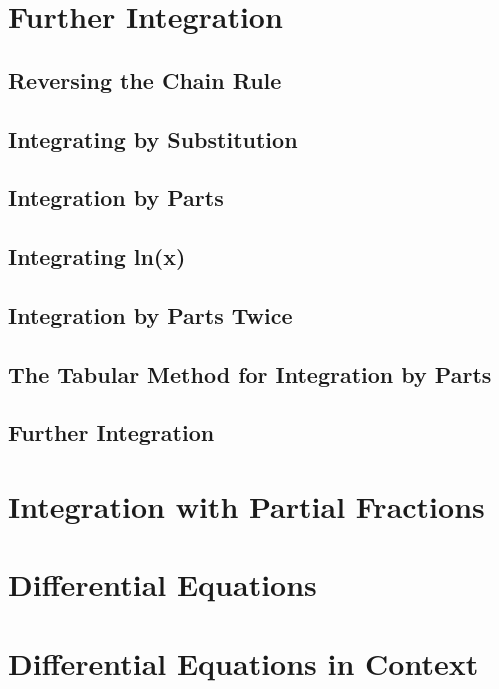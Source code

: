 \documentclass[../alevelmaths.tex]{subfiles}
\begin{document}
\section{Further Integration}
\subsection*{Reversing the Chain Rule}
\subsection*{Integrating by Substitution}
\subsection*{Integration by Parts}
\subsection*{Integrating ln(x)}
\subsection*{Integration by Parts Twice}
\subsection*{The Tabular Method for Integration by Parts}
\subsection*{Further Integration}
\section{Integration with Partial Fractions}
\section{Differential Equations}
\section{Differential Equations in Context}
\end{document}
